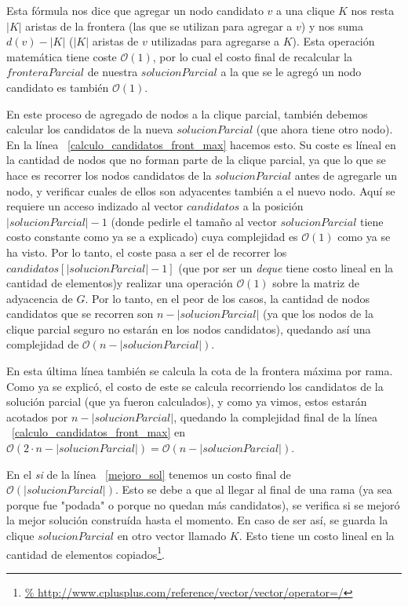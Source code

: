 \par Esta f\'ormula nos dice que agregar un nodo candidato $v$ a una clique $K$
    nos resta $|K|$ aristas de la frontera (las que se utilizan para agregar
    a $v$) y nos suma $d(v) - |K|$ ($|K|$ aristas de $v$ utilizadas para agregarse
    a $K$). Esta operaci\'on matem\'atica tiene coste $\mathcal O(1)$, por lo cual
    el costo final de recalcular la $fronteraParcial$ de nuestra $solucionParcial$
    a la que se le agreg\'o un nodo candidato es tambi\'en $\mathcal O(1)$.

\par En este proceso de agregado de nodos a la clique parcial, tambi\'en debemos
    calcular los candidatos de la nueva $solucionParcial$ (que ahora tiene otro
    nodo). En la l\'inea ~\ref{calculo_candidatos_front_max} hacemos esto. Su coste
    es l\'ineal en la cantidad de nodos que no forman parte de la clique parcial,
    ya que lo que se hace es recorrer los nodos candidatos de la $solucionParcial$
    antes de agregarle un nodo, y verificar cuales de ellos son adyacentes tambi\'en
    a el nuevo nodo. Aqu\'i se requiere un acceso indizado al vector $candidatos$
    a la posici\'on $|solucionParcial|-1$ (donde pedirle el tama\~no al vector
    $solucionParcial$ tiene costo constante como ya se a explicado) cuya complejidad
    es $\mathcal O(1)$ como ya se ha visto. Por lo tanto, el coste pasa a ser el de
    recorrer los $candidatos[|solucionParcial|-1]$ (que por ser un \emph{deque} tiene
    costo lineal en la cantidad de elementos)y realizar una operaci\'on
    $\mathcal O(1)$ sobre la matriz de adyacencia de $G$. Por lo tanto, en el peor
    de los casos, la cantidad de nodos candidatos que se recorren son $n - |solucionParcial|$
    (ya que los nodos de la clique parcial seguro no estar\'an en los nodos candidatos),
    quedando as\'i una complejidad de $\mathcal O(n - |solucionParcial|)$.

\par En esta \'ultima l\'inea tambi\'en se calcula la cota de la frontera m\'axima
    por rama. Como ya se explic\'o, el costo de este se calcula recorriendo los
    candidatos de la soluci\'on parcial (que ya fueron calculados), y como ya vimos,
    estos estar\'an acotados por $n - |solucionParcial|$, quedando la complejidad
    final de la l\'inea ~\ref{calculo_candidatos_front_max} en $\mathcal O(2\cdot
    n - |solucionParcial|) = \mathcal O(n - |solucionParcial|)$.

\par En el \emph{si} de la l\'inea ~\ref{mejoro_sol} tenemos un costo final de
    $\mathcal O(|solucionParcial|)$. Esto se debe a que al llegar al final de una
    rama (ya sea porque fue "podada" o porque no quedan m\'as candidatos), se verifica
    si se mejor\'o la mejor soluci\'on constru\'ida hasta el momento. En caso de ser
    as\'i, se guarda la clique $solucionParcial$ en otro vector llamado $K$. Esto tiene
    un costo lineal en la cantidad de elementos copiados\footnote{\url{%
    http://www.cplusplus.com/reference/vector/vector/operator=/}}.

